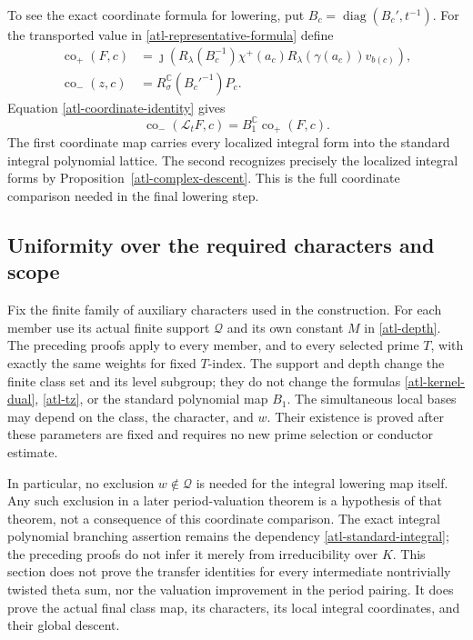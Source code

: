 To see the exact coordinate formula for lowering,
put $B_c=\operatorname{diag}(B_c',t^{-1})$.  For the
transported value in \eqref{atl-representative-formula}
define
\begin{align*}
 \operatorname{co}_+(F,c)
  &=\jmath\left(R_\lambda(B_c^{-1})
       \chi^+(a_c)R_\lambda(\gamma(a_c))v_{b(c)}\right),\\
 \operatorname{co}_-(z,c)
  &=R_\sigma^{\mathbb C}(B_c'^{-1})P_c.
\end{align*}
Equation \eqref{atl-coordinate-identity} gives
\begin{equation}\label{atl-final-coordinate}
 \operatorname{co}_-(\mathcal L_tF,c)
                   =B_1^{\mathbb C}\operatorname{co}_+(F,c).
\end{equation}
The first coordinate map carries every localized
integral form into the standard integral polynomial
lattice.  The second recognizes precisely the
localized integral forms by
Proposition~\ref{atl-complex-descent}.  This is the
full coordinate comparison needed in the final
lowering step.

\subsection{Uniformity over the required characters and scope}

Fix the finite family of auxiliary characters used
in the construction.  For each member use its actual
finite support $\mathcal Q$ and its own constant $M$
in \eqref{atl-depth}.  The preceding proofs apply
to every member, and to every selected prime $T$,
with exactly the same weights for fixed $T$-index.
The support and depth change the finite class set and
its level subgroup; they do not change the formulas
\eqref{atl-kernel-dual}, \eqref{atl-tz}, or the
standard polynomial map $B_1$.  The simultaneous
local bases may depend on the class, the character,
and $w$.  Their existence is proved after these
parameters are fixed and requires no new prime
selection or conductor estimate.

In particular, no exclusion $w\notin\mathcal Q$ is
needed for the integral lowering map itself.  Any
such exclusion in a later period-valuation theorem
is a hypothesis of that theorem, not a consequence
of this coordinate comparison.  The exact integral
polynomial branching assertion remains the dependency
\eqref{atl-standard-integral}; the preceding proofs
do not infer it merely from irreducibility over $K$.
This section does not prove the transfer identities
for every intermediate nontrivially twisted theta
sum, nor the valuation improvement in the period
pairing.  It does prove the actual final class map,
its characters, its local integral coordinates, and
their global descent.

